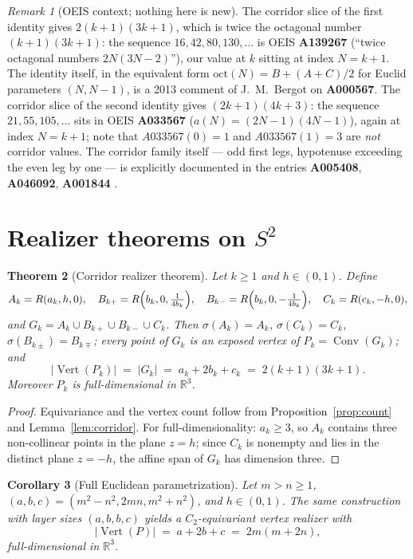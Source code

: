 \documentclass[11pt]{article}
\newtheorem{theorem}{Theorem}[section]
\newtheorem{corollary}[theorem]{Corollary}
\theoremstyle{definition}
\theoremstyle{remark}
\newtheorem{remark}[theorem]{Remark}
\newcommand{\Vertset}{\operatorname{Vert}}
\newcommand{\Conv}{\operatorname{Conv}}
\newcommand{\Ctwo}{C_2}
\begin{document}
\begin{remark}[OEIS context; nothing here is new]\label{rem:oeis}
The corridor slice of the first identity gives
$2(k+1)(3k+1)$, which is twice the octagonal number $(k+1)(3k+1)$: the
sequence $16, 42, 80, 130, \dots$ is OEIS \textbf{A139267} (``twice
octagonal numbers $2N(3N-2)$''), our value at $k$ sitting at index
$N=k+1$. The identity itself, in the equivalent form
$\mathrm{oct}(N)=B+(A+C)/2$ for Euclid parameters $(N,N-1)$, is a 2013
comment of J.~M.~Bergot on \textbf{A000567}. The corridor slice of the
second identity gives $(2k+1)(4k+3)$: the sequence $21,55,105,\dots$ sits
in OEIS \textbf{A033567} ($a(N)=(2N-1)(4N-1)$), again at index $N=k+1$;
note that $A033567(0)=1$ and $A033567(1)=3$ are \emph{not} corridor
values. The corridor family itself --- odd first legs, hypotenuse
exceeding the even leg by one --- is explicitly documented in the entries
\textbf{A005408}, \textbf{A046092}, \textbf{A001844} \cite{oeis}.
\end{remark}

\section{Realizer theorems on $S^2$}\label{sec:theorems}

\begin{theorem}[Corridor realizer theorem]\label{thm:corridor}
Let $k\ge1$ and $h\in(0,1)$. Define
\[
A_k=R(a_k,h,0),\quad
B_{k+}=R\Bigl(b_k,0,\tfrac{1}{4b_k}\Bigr),\quad
B_{k-}=R\Bigl(b_k,0,-\tfrac{1}{4b_k}\Bigr),\quad
C_k=R(c_k,-h,0),
\]
and $G_k=A_k\cup B_{k+}\cup B_{k-}\cup C_k$. Then $\sigma(A_k)=A_k$,
$\sigma(C_k)=C_k$, $\sigma(B_{k\pm})=B_{k\mp}$; every point of $G_k$ is an
exposed vertex of $P_k=\Conv(G_k)$; and
\[
|\Vertset(P_k)| \;=\; |G_k| \;=\; a_k+2b_k+c_k \;=\; 2(k+1)(3k+1).
\]
Moreover $P_k$ is full-dimensional in $\mathbb R^3$.
\end{theorem}

\begin{proof}
Equivariance and the vertex count follow from
Proposition~\ref{prop:count} and Lemma~\ref{lem:corridor}. For
full-dimensionality: $a_k\ge3$, so $A_k$ contains three non-collinear
points in the plane $z=h$; since $C_k$ is nonempty and lies in the
distinct plane $z=-h$, the affine span of $G_k$ has dimension three.
\end{proof}

\begin{corollary}[Full Euclidean parametrization]\label{cor:euclid}
Let $m>n\ge1$, $(a,b,c)=(m^2-n^2,2mn,m^2+n^2)$, and $h\in(0,1)$. The same
construction with layer sizes $(a,b,b,c)$ yields a $\Ctwo$-equivariant
vertex realizer with
\[
|\Vertset(P)| \;=\; a+2b+c \;=\; 2m(m+2n),
\]
full-dimensional in $\mathbb R^3$.
\end{corollary}
\end{document}
